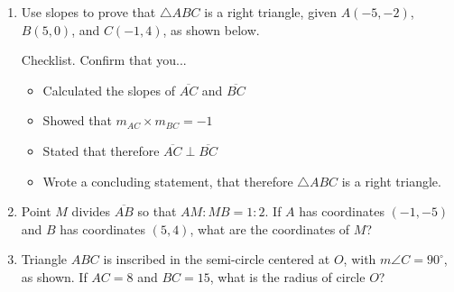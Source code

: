 \documentclass[12pt, oneside]{article}
\begin{document}
\begin{enumerate}
  \item Use slopes to prove that $\triangle ABC$ is a right triangle, given $A(-5,-2)$, $B(5,0)$, and $C(-1,4)$, as shown below.
    \begin{multicols}{2}
      Checklist. Confirm that you...
      \begin{itemize}
        \item Calculated the slopes of $\overline{AC}$ and $\overline{BC}$
        \item Showed that $m_{AC} \times m_{BC} = -1$
        \item Stated that therefore $\overline{AC} \perp \overline{BC}$
        \item Wrote a concluding statement, that therefore $\triangle ABC$ is a right triangle.
      \end{itemize}
    \end{multicols}

\newpage
 \item Point $M$ divides $\overline{AB}$ so that $AM{:}MB = 1{:}2$. If $A$ has coordinates $(-1,-5)$ and $B$ has coordinates $(5,4)$, what are the coordinates of $M$? \vspace{6cm}

 \item Triangle $ABC$ is inscribed in the semi-circle centered at $O$, with $m\angle C=90^\circ$, as shown. If $AC=8$ and $BC=15$, what is the radius of circle $O$? \vspace{0.5cm}
   \begin{center}
  \end{center}\vspace{5cm}


\end{enumerate}
\newpage
\setcounter{page}{1}
\end{document}
